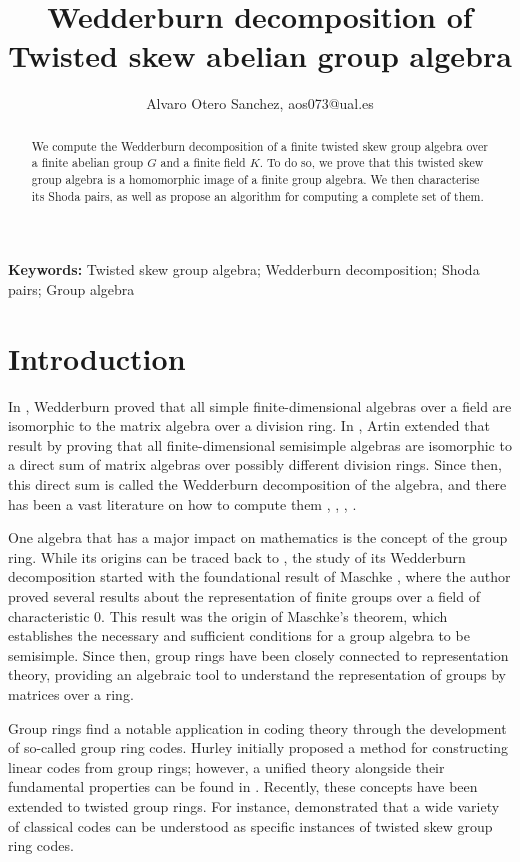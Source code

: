 \documentclass{article}
\title{Wedderburn decomposition of Twisted skew abelian group algebra}
\author{Alvaro Otero Sanchez, aos073@ual.es}
\begin{document}
\maketitle

\begin{abstract}
We compute the Wedderburn decomposition of a finite twisted skew group algebra over a finite abelian group $G$ and a finite field $K$. To do so, we prove that this twisted skew group algebra is a homomorphic image of a finite group algebra. We then characterise its Shoda pairs, as well as propose an algorithm for computing a complete set of them.
\end{abstract}

\textbf{Keywords:}
Twisted skew group algebra; Wedderburn decomposition; Shoda pairs;  Group algebra

\section{Introduction}
In \cite{Wedderburn1908}, Wedderburn proved that all simple finite-dimensional algebras over a field are isomorphic to the matrix algebra over a division ring. In \cite{Artin1927}, Artin extended that result by proving that all finite-dimensional semisimple algebras are isomorphic to a direct sum of matrix algebras over possibly different division rings. Since then, this direct sum is called the Wedderburn decomposition of the algebra, and there has been a vast literature on how to compute them \cite{Pierce1982}, \cite{Behboodi2018}, \cite{Bade1992}, \cite{DeGraaf1997}.

One algebra that has a major impact on mathematics is the concept of the group ring. While its origins can be traced back to \cite{Molien1897}, the study of its Wedderburn decomposition started with the foundational result of Maschke \cite{Maschke1899}, where the author proved several results about the representation of finite groups over a field of characteristic $0$. This result was the origin of Maschke's theorem, which establishes the necessary and sufficient conditions for a group algebra to be semisimple. Since then, group rings have been closely connected to representation theory, providing an algebraic tool to understand the representation of groups by matrices over a ring. 

Group rings find a notable application in coding theory through the development of 
so-called group ring codes. Hurley \cite{HurleyHurley2009} initially proposed 
a method for constructing linear codes from group rings; however, a unified theory 
alongside their fundamental properties can be found in \cite{Hughes2001}. 
Recently, these concepts have been extended to twisted group rings. For instance, 
\cite{BehajainaBorelloDeLaCruz2024} demonstrated that a wide variety of classical codes can be understood as specific instances of twisted skew group ring codes.
\end{document}
